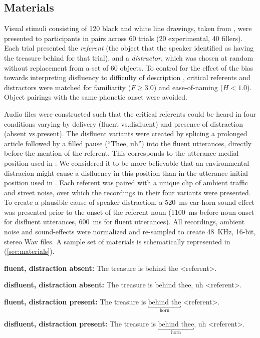 \documentclass[a4paper,man,natbib]{apa6}
\newcommand*{\spex}[1]{``{#1}''} %
\begin{document}
\subsection{Materials}
Visual stimuli consisting of 120 black and white line drawings, taken from \citet{Snodgrass1980}, were presented to participants in pairs across 60 trials (20 experimental, 40 fillers). 
Each trial presented the \textit{referent} (the object that the speaker identified as having the treasure behind for that trial), and a \textit{distractor}, which was chosen at random without replacement from a set of 60 objects. 
To control for the effect of the bias towards interpreting disfluency to difficulty of description \citep{Arnold2007}, critical referents and distractors were matched for familiarity ($F \ge 3.0$) and ease-of-naming ($H <1.0$). 
Object pairings with the same phonetic onset were avoided. 

Audio files were constructed such that the critical referents could be heard in four conditions varying by delivery (fluent vs.\@ disfluent) and presence of distraction (absent vs.\@ present). 
The disfluent variants were created by splicing a prolonged article followed by a filled pause (\spex{Thee, uh}) into the fluent utterances, directly before the mention of the referent.
This corresponds to the utterance-medial position used in \citet[][Experiment~2]{Loy2016}:
We considered it to be more believable that an environmental distracion might cause a disfluency in this position than in the utterance-initial position used in \citet[][Experiment~1]{Loy2016}.
Each referent was paired with a unique clip of ambient traffic and street noise, over which the recordings in their four variants were presented.
To create a plausible cause of speaker distraction, a 520~ms car-horn sound effect was presented prior to the onset of the referent noun (1100~ms before noun onset for disfluent utterances, 600~ms for fluent utterances). 
All recordings, ambient noise and sound-effects were normalized and re-sampled to create 48~KHz, 16-bit, stereo Wav files.
A sample set of materials is schematically represented in (\ref{sec:materials}).

\begin{examples}\label{sec:materials}
\item \textbf{fluent, distraction absent:} The treasure is behind the \textless referent\textgreater .
\item \textbf{disfluent, distraction absent:} The treasure is behind thee, uh \textless referent\textgreater .
\item \textbf{fluent, distraction present:} The treasure is $\underbracket{\text{behind the}}_\text{horn}$ \textless referent\textgreater .
\item \textbf{disfluent, distraction present:} The treasure is $\underbracket{\text{behind thee}}_\text{horn}$, uh \textless referent\textgreater .
\end{examples}
\end{document}
